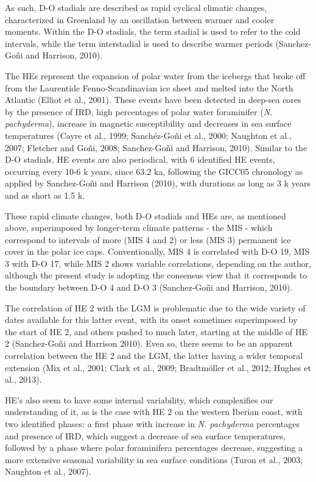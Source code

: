 \documentclass[12pt,twoside]{reedthesis}
\begin{document}
As such, D-O stadials are described as rapid cyclical climatic changes, characterized in Greenland by an oscillation between warmer and cooler moments. Within the D-O stadials, the term stadial is used to refer to the cold intervals, while the term interstadial is used to describe warmer periods (Sanchez-Goñi and Harrison, 2010).

The HEs represent the expansion of polar water from the icebergs that broke off from the Laurentide Fenno-Scandinavian ice sheet and melted into the North Atlantic (Elliot et al., 2001). These events have been detected in deep-sea cores by the presence of IRD, high percentages of polar water foraminifer (\emph{N. pachyderma}), increase in magnetic susceptibility and decreases in sea surface temperatures (Cayre et al., 1999; Sanchéz-Goñi et al., 2000; Naughton et al., 2007; Fletcher and Goñi, 2008; Sanchez-Goñi and Harrison, 2010). Similar to the D-O stadials, HE events are also periodical, with 6 identified HE events, occurring every 10-6 k years, since 63.2 ka, following the GICC05 chronology as applied by Sanchez-Goñi and Harrison (2010), with durations as long as 3 k years and as short as 1.5 k.

These rapid climate changes, both D-O stadials and HEs are, as mentioned above, superimposed by longer-term climate patterns - the MIS - which correspond to intervals of more (MIS 4 and 2) or less (MIS 3) permanent ice cover in the polar ice caps. Conventionally, MIS 4 is correlated with D-O 19, MIS 3 with D-O 17, while MIS 2 shows variable correlations, depending on the author, although the present study is adopting the consensus view that it corresponds to the boundary between D-O 4 and D-O 3 (Sanchez-Goñi and Harrison, 2010).

The correlation of HE 2 with the LGM is problematic due to the wide variety of dates available for this latter event, with its onset sometimes superimposed by the start of HE 2, and others pushed to much later, starting at the middle of HE 2 (Sanchez-Goñi and Harrison 2010). Even so, there seems to be an apparent correlation between the HE 2 and the LGM, the latter having a wider temporal extension (Mix et al., 2001; Clark et al., 2009; Bradtmöller et al., 2012; Hughes et al., 2013).

HE's also seem to have some internal variability, which complexifies our understanding of it, as is the case with HE 2 on the western Iberian coast, with two identified phases: a first phase with increase in \emph{N. pachyderma} percentages and presence of IRD, which suggest a decrease of sea surface temperatures, followed by a phase where polar foraminifera percentages decrease, suggesting a more extensive seasonal variability in sea surface conditions (Turon et al., 2003; Naughton et al., 2007).
\end{document}
